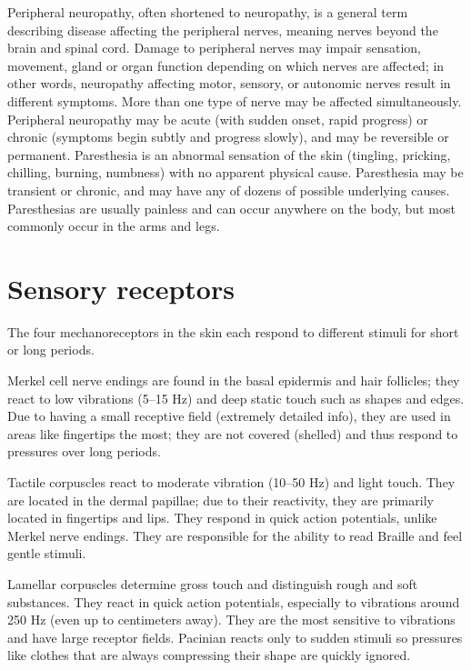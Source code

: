 \documentclass[]{book}
\begin{document}
Peripheral neuropathy, often shortened to neuropathy, is a general term describing disease affecting the peripheral nerves, meaning nerves beyond the brain and spinal cord. Damage to peripheral nerves may impair sensation, movement, gland or organ function depending on which nerves are affected; in other words, neuropathy affecting motor, sensory, or autonomic nerves result in different symptoms. More than one type of nerve may be affected simultaneously. Peripheral neuropathy may be acute (with sudden onset, rapid progress) or chronic (symptoms begin subtly and progress slowly), and may be reversible or permanent. Paresthesia is an abnormal sensation of the skin (tingling, pricking, chilling, burning, numbness) with no apparent physical cause. Paresthesia may be transient or chronic, and may have any of dozens of possible underlying causes. Paresthesias are usually painless and can occur anywhere on the body, but most commonly occur in the arms and legs.

\hypertarget{sensory-receptors}{%
\section{Sensory receptors}\label{sensory-receptors}}

The four mechanoreceptors in the skin each respond to different stimuli for short or long periods.

Merkel cell nerve endings are found in the basal epidermis and hair follicles; they react to low vibrations (5--15 Hz) and deep static touch such as shapes and edges. Due to having a small receptive field (extremely detailed info), they are used in areas like fingertips the most; they are not covered (shelled) and thus respond to pressures over long periods.

Tactile corpuscles react to moderate vibration (10--50 Hz) and light touch. They are located in the dermal papillae; due to their reactivity, they are primarily located in fingertips and lips. They respond in quick action potentials, unlike Merkel nerve endings. They are responsible for the ability to read Braille and feel gentle stimuli.

Lamellar corpuscles determine gross touch and distinguish rough and soft substances. They react in quick action potentials, especially to vibrations around 250 Hz (even up to centimeters away). They are the most sensitive to vibrations and have large receptor fields. Pacinian reacts only to sudden stimuli so pressures like clothes that are always compressing their shape are quickly ignored.
\end{document}
